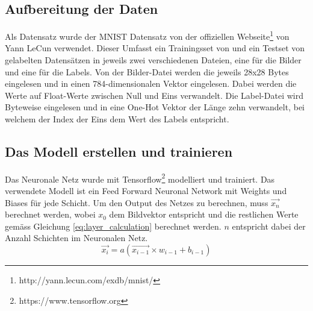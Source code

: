 \documentclass[Interploate_hadwritten_Digits.tex]{subfiles}
\begin{document}
	\subsection{Aufbereitung der Daten}
	Als Datensatz wurde der MNIST Datensatz von der offiziellen Webseite\footnote{ http://yann.lecun.com/exdb/mnist/} von Yann LeCun verwendet. Dieser Umfasst ein Trainingsset von  und ein Testset von  gelabelten Datensätzen in jeweils zwei verschiedenen Dateien, eine für die Bilder und eine für die Labels. Von der Bilder-Datei werden die jeweils 28x28 Bytes eingelesen und in einen 784-dimensionalen Vektor eingelesen. Dabei werden die Werte auf Float-Werte zwischen Null und Eins verwandelt. Die Label-Datei wird Byteweise eingelesen und in eine One-Hot Vektor der Länge zehn verwandelt, bei welchem der Index der Eins dem Wert des Labels entspricht. 
	
	\subsection{Das Modell erstellen und trainieren}
	Das Neuronale Netz wurde mit Tensorflow\footnote{https://www.tensorflow.org} modelliert und trainiert. Das verwendete Modell ist ein Feed Forward Neuronal Network mit Weights und Biases für jede Schicht. Um den Output des Netzes zu berechnen, muss $ \vec{x_{n}} $ berechnet werden, wobei $ x_{0} $ dem Bildvektor entspricht und die restlichen Werte gemäss Gleichung \ref{eq:layer_calculation} berechnet werden. $ n $ entspricht dabei der Anzahl Schichten im Neuronalen Netz.
	\begin{equation}
	\vec{x_{i}} = a(\vec{x_{i-1}} \times w_{i-1} + b_{i-1})
	\label{eq:layer_calculation}
	\end{equation}
	
\end{document}

